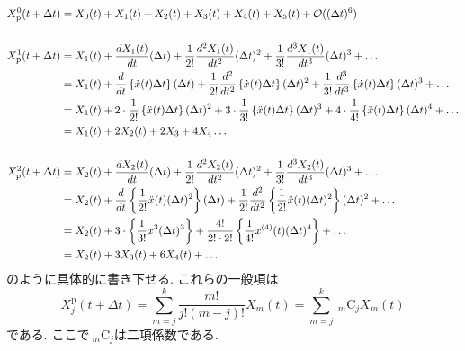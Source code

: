 \begin{align}
  X_{\mathrm{p}}^{0} (t + \Delta t)
  &=
  X_{0}(t) + X_{1}(t) + X_{2}(t) +
  X_{3}(t) + X_{4}(t) + X_{5}(t) + \mathcal{O}((\Delta t)^6)
  \notag \\ \notag \\
  X_{\mathrm{p}}^{1} (t + \Delta t)
  &=
  X_{1}(t)
  + \frac{d X_{1}(t)}{dt} (\Delta t)
  + \frac{1}{2!} \frac{d^{2} X_{1}(t)}{dt^{2}} (\Delta t)^{2}
  + \frac{1}{3!} \frac{d^{3} X_{1}(t)}{dt^{3}} (\Delta t)^{3}
  + \ldots
  \notag \\
  &=
  X_{1}(t)
  + \frac{d}{dt}                    \left\{\dot{x}(t) \Delta t \right\}(\Delta t)
  + \frac{1}{2!} \frac{d^{2}}{dt^2} \left\{\dot{x}(t) \Delta t \right\}(\Delta t)^{2}
  + \frac{1}{3!} \frac{d^{3}}{dt^3} \left\{\dot{x}(t) \Delta t \right\}(\Delta t)^{3}
  + \ldots
  \notag \\
  &=
  X_{1}(t)
  + 2 \cdot \frac{1}{2!} \left\{\ddot{x}(t) \Delta t \right\}(\Delta t)^{2}
  + 3 \cdot \frac{1}{3!} \left\{\ddot{x}(t) \Delta t \right\}(\Delta t)^{3}
  + 4 \cdot \frac{1}{4!} \left\{\ddot{x}(t) \Delta t \right\}(\Delta t)^{4}
  + \ldots
  \notag \\
  &=
  X_{1}(t) + 2 X_{2} (t) + 2 X_{3} + 4 X_{4} \ldots
  \notag \\ \notag \\
  X_{\mathrm{p}}^{2} (t + \Delta t)
  &=
  X_{2}(t)
  + \frac{d X_{2}(t)}{dt} (\Delta t)
  + \frac{1}{2!} \frac{d^{2} X_{2}(t)}{dt^{2}} (\Delta t)^{2}
  + \frac{1}{3!} \frac{d^{3} X_{2}(t)}{dt^{3}} (\Delta t)^{3}
  + \ldots
  \notag \\
  &=
  X_{2}(t)
  + \frac{d}{dt} 
    \left\{
      \frac{1}{2!}
      \ddot{x}(t) (\Delta t)^{2}
    \right\}(\Delta t)
  + \frac{1}{2!} \frac{d^{2}}{dt^2}
    \left\{
      \frac{1}{2!}
      \ddot{x}(t) (\Delta t)^{2}
    \right\}(\Delta t)^{2}
  + \ldots
  \notag \\
  &=
  X_{2}(t)
  + 3 \cdot \left\{\frac{1}{3!} x^{3} (\Delta t)^{3} \right\}
  + \frac{4!}{2! \cdot 2!}\left\{ \frac{1}{4!} x^{(4)} (t) (\Delta t)^{4}\right\}
  + \ldots
  \notag \\
  &=
  X_{2}(t) + 3 X_{3}(t) + 6 X_{4}(t) + \ldots
  \notag
\end{align}
のように具体的に書き下せる. これらの一般項は
\begin{equation}
  X_{j}^{\mathrm{p}}(t + \Delta t)
  =
  \sum_{m=j}^{k} \frac{m!}{j! (m-j)!} X_{m} (t)
  =
  \sum_{m=j}^{k} ~_m\mathrm{C}_{j} X_{m} (t)
\end{equation}
である. ここで$~_m\mathrm{C}_{j}$は二項係数である.
